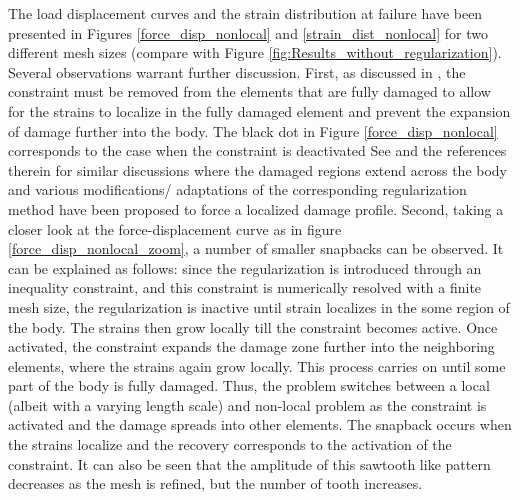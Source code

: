 \documentclass[10pt]{cas-sc}
\begin{document}
The load displacement curves and the strain distribution at failure have been presented in Figures \ref{force_disp_nonlocal} and \ref{strain_dist_nonlocal} for two different mesh sizes (compare with Figure \ref{fig:Results_without_regularization}). Several observations warrant further discussion. First, as discussed in \cite{Kamasamudram2023}, the constraint must be removed from the elements that are fully damaged to allow for the strains to localize in the fully damaged element and prevent the expansion of damage further into the body. The black dot in Figure \ref{force_disp_nonlocal} corresponds to the case when the constraint is deactivated  See \cite{Geers1998,Cabot2014,le2018strain} and the references therein for similar discussions where the damaged regions extend across the body and various modifications/ adaptations of the corresponding regularization method have been proposed to force a localized damage profile. Second, taking a closer look at the force-displacement curve as in figure \ref{force_disp_nonlocal_zoom}, a number of smaller snapbacks can be observed. It can be explained as follows: since the regularization is introduced through an inequality constraint, and this constraint is numerically resolved with a finite mesh size, the regularization is inactive until strain localizes in the some region of the body. The strains then grow locally till the constraint becomes active. Once activated, the constraint expands the damage zone further into the neighboring elements, where the strains again grow locally. This process carries on until some part of the body is fully damaged. Thus, the problem switches between a local (albeit with a varying length scale) and non-local problem as the constraint is activated and the damage spreads into other elements. The snapback occurs when the strains localize and the recovery corresponds to the activation of the constraint. It can also be seen that the amplitude of this sawtooth like pattern decreases as the mesh is refined, but the number of tooth increases.
\end{document}
